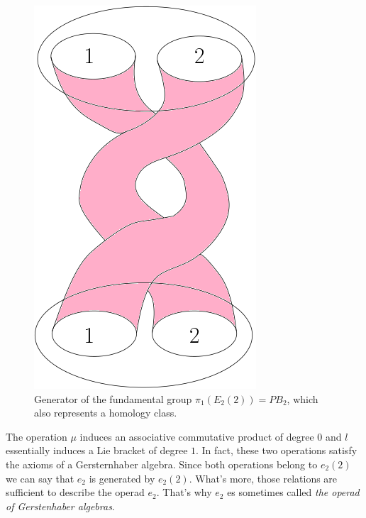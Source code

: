 \documentclass[TFM.tex]{subfiles}
\begin{document}
\begin{figure}[h!]
	\centering
	\includegraphics[scale=0.4]{Imagenes/generador}
	\caption{Generator of the fundamental group $\pi_1(E_2(2))=PB_2$, which also represents a homology class.}
\end{figure}

The operation $\mu$ induces an associative commutative product of degree 0  and $l$ essentially induces a Lie bracket of degree $1$. In fact, these two operations satisfy the axioms of a Gersternhaber algebra. Since both operations belong to $e_2(2)$ we can say that $e_2$ is generated by $e_2(2)$. What's more, those relations are sufficient to describe the operad $e_2$. That's why $e_2$ es sometimes called \emph{the operad of Gerstenhaber algebras}. %


\end{document}
